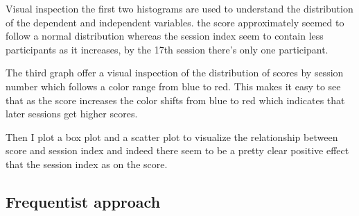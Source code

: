 \documentclass[
  ignorenonframetext,
]{beamer}
\begin{document}
\begin{frame}[fragile]{Visual inspection}
the first two histograms are used to understand the distribution of the
dependent and independent variables. the score approximately seemed to
follow a normal distribution whereas the session index seem to contain
less participants as it increases, by the 17th session there's only one
participant.

The third graph offer a visual inspection of the distribution of scores
by session number which follows a color range from blue to red. This
makes it easy to see that as the score increases the color shifts from
blue to red which indicates that later sessions get higher scores.

Then I plot a box plot and a scatter plot to visualize the relationship
between score and session index and indeed there seem to be a pretty
clear positive effect that the session index as on the score.
\end{frame}

\hypertarget{frequentist-approach-2}{%
\subsection{Frequentist approach}\label{frequentist-approach-2}}
\end{document}
